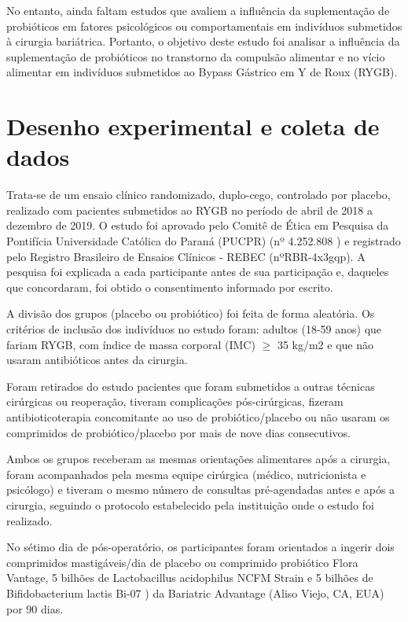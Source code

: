 No entanto, ainda faltam estudos que avaliem a influência da suplementação de probióticos em fatores psicológicos ou comportamentais em indivíduos submetidos à cirurgia bariátrica. Portanto, o objetivo deste estudo foi analisar a influência da suplementação de probióticos no transtorno da compulsão alimentar e no vício alimentar em indivíduos submetidos ao Bypass Gástrico em Y de Roux (RYGB).


\section{Desenho experimental e coleta de dados}

Trata-se de um ensaio clínico randomizado, duplo-cego, controlado por placebo, realizado com pacientes submetidos ao RYGB no período de abril de 2018 a dezembro de 2019. O estudo foi aprovado pelo Comitê de Ética em Pesquisa da Pontifícia Universidade Católica do Paraná (PUCPR) (nº 4.252.808 ) e registrado pelo Registro Brasileiro de Ensaios Clínicos - REBEC (nºRBR-4x3gqp). A pesquisa foi explicada a cada participante antes de sua participação e, daqueles que concordaram, foi obtido o consentimento informado por escrito.

A divisão dos grupos (placebo ou probiótico) foi feita de forma aleatória. Os critérios de inclusão dos indivíduos no estudo foram: adultos (18-59 anos) que fariam RYGB, com índice de massa corporal (IMC) $\geq$ 35 kg/m2 e que não usaram antibióticos antes da cirurgia. 

Foram retirados do estudo pacientes que foram submetidos a outras técnicas cirúrgicas ou reoperação, tiveram complicações pós-cirúrgicas, fizeram antibioticoterapia concomitante ao uso de probiótico/placebo ou não usaram os comprimidos de probiótico/placebo por mais de nove dias consecutivos. 

Ambos os grupos receberam as mesmas orientações alimentares após a cirurgia, foram acompanhados pela mesma equipe cirúrgica (médico, nutricionista e psicólogo) e tiveram o mesmo número de consultas pré-agendadas antes e após a cirurgia, seguindo o protocolo estabelecido pela instituição onde o estudo foi realizado.

No sétimo dia de pós-operatório, os participantes foram orientados a ingerir dois comprimidos mastigáveis/dia de placebo ou comprimido probiótico Flora Vantage, 5 bilhões de Lactobacillus acidophilus NCFM \textregistered Strain e 5 bilhões de Bifidobacterium lactis Bi-07 \textregistered) da Bariatric Advantage (Aliso Viejo, CA, EUA) por 90 dias.

